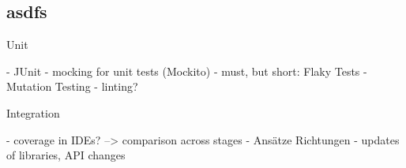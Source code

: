 \subsection{asdfs}
\begin{frame}
	Unit

- JUnit
- mocking for unit tests (Mockito)
- must, but short: Flaky Tests
- Mutation Testing
- linting?

Integration

- coverage in IDEs? --> comparison across stages
- Ansätze Richtungen
- updates of libraries, API changes
\end{frame}